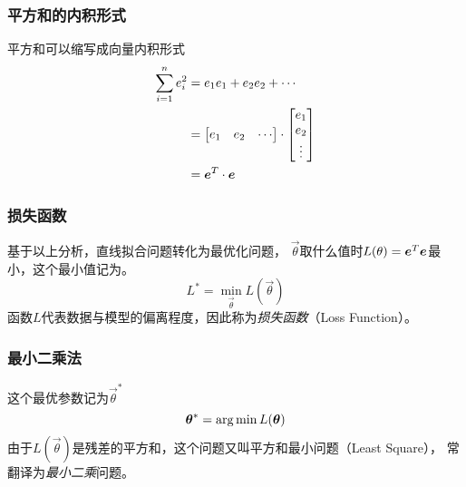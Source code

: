 \documentclass[14pt]{beamer}
\begin{document}
    \begin{frame}
        \frametitle{平方和的内积形式}
        平方和可以缩写成向量内积形式
        \begin{align*}
            \sum_{i=1}^n e_i^2&= e_1e_1+e_2e_2+\cdots\\
                    &=\begin{bmatrix}
                        e_1 & e_2 & \cdots
                    \end{bmatrix}\cdot
                    \begin{bmatrix}
                        e_1\\
                        e_2\\
                        \vdots
                    \end{bmatrix}\\
                    &=\bm{e}^T\cdot\bm{e}
        \end{align*}
    \end{frame}

    \begin{frame}
        \frametitle{损失函数}
        基于以上分析，直线拟合问题转化为最优化问题，
        $\vec{\theta}$取什么值时$L(\theta)=\bm{e}^T\bm{e}$最小，这个最小值记为。
        \begin{equation} \label{eq:least_square}
            L^*=\min_{\vec{\theta}} L(\vec{\theta})
        \end{equation}
        函数$L$代表数据与模型的偏离程度，因此称为\emph{损失函数}（Loss Function）。
    \end{frame}
    
    \begin{frame}
        \frametitle{最小二乘法}
        这个最优参数记为$\vec{\theta}^*$
        \begin{equation}
            \bm{\theta}^*=\operatorname*{arg\,min} L(\bm{\theta})
        \end{equation}
        由于$L(\vec{\theta})$是残差的平方和，这个问题又叫平方和最小问题（Least Square），
        常翻译为\emph{最小二乘}问题。
    \end{frame}
\end{document}
